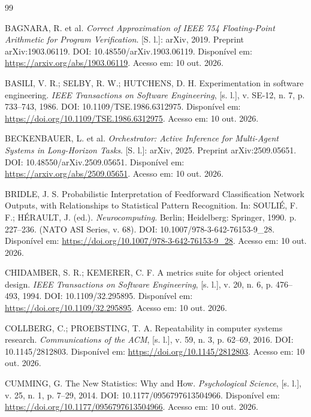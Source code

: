 \begin{thebibliography}{99}

 BAGNARA, R. et al. \textit{Correct Approximation of IEEE 754 Floating-Point Arithmetic for Program Verification}. [S. l.]: arXiv, 2019. Preprint arXiv:1903.06119. DOI: 10.48550/arXiv.1903.06119. Disponível em: \url{https://arxiv.org/abs/1903.06119}. Acesso em: 10 out. 2026.

 BASILI, V. R.; SELBY, R. W.; HUTCHENS, D. H. Experimentation in software engineering. \textit{IEEE Transactions on Software Engineering}, [s. l.], v. SE-12, n. 7, p. 733--743, 1986. DOI: 10.1109/TSE.1986.6312975. Disponível em: \url{https://doi.org/10.1109/TSE.1986.6312975}. Acesso em: 10 out. 2026.

 BECKENBAUER, L. et al. \textit{Orchestrator: Active Inference for Multi-Agent Systems in Long-Horizon Tasks}. [S. l.]: arXiv, 2025. Preprint arXiv:2509.05651. DOI: 10.48550/arXiv.2509.05651. Disponível em: \url{https://arxiv.org/abs/2509.05651}. Acesso em: 10 out. 2026.

 BRIDLE, J. S. Probabilistic Interpretation of Feedforward Classification Network Outputs, with Relationships to Statistical Pattern Recognition. In: SOULIÉ, F. F.; HÉRAULT, J. (ed.). \textit{Neurocomputing}. Berlin; Heidelberg: Springer, 1990. p. 227--236. (NATO ASI Series, v. 68). DOI: 10.1007/978-3-642-76153-9\_28. Disponível em: \url{https://doi.org/10.1007/978-3-642-76153-9_28}. Acesso em: 10 out. 2026.

 CHIDAMBER, S. R.; KEMERER, C. F. A metrics suite for object oriented design. \textit{IEEE Transactions on Software Engineering}, [s. l.], v. 20, n. 6, p. 476--493, 1994. DOI: 10.1109/32.295895. Disponível em: \url{https://doi.org/10.1109/32.295895}. Acesso em: 10 out. 2026.

 COLLBERG, C.; PROEBSTING, T. A. Repeatability in computer systems research. \textit{Communications of the ACM}, [s. l.], v. 59, n. 3, p. 62--69, 2016. DOI: 10.1145/2812803. Disponível em: \url{https://doi.org/10.1145/2812803}. Acesso em: 10 out. 2026.

 CUMMING, G. The New Statistics: Why and How. \textit{Psychological Science}, [s. l.], v. 25, n. 1, p. 7--29, 2014. DOI: 10.1177/0956797613504966. Disponível em: \url{https://doi.org/10.1177/0956797613504966}. Acesso em: 10 out. 2026.


\end{thebibliography}
